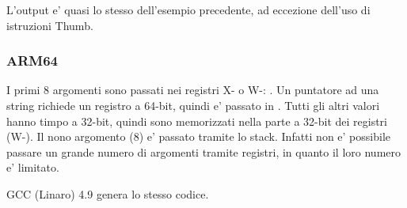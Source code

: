 L'output e' quasi lo stesso dell'esempio precedente, ad eccezione dell'uso di istruzioni Thumb. 

\subsubsection{ARM64}




I primi 8 argomenti sono passati nei registri X- o W-: \ARMPCS.
Un puntatore ad una string richiede un registro a 64-bit, quindi e' passato in .
Tutti gli altri valori hanno timpo \Tint a 32-bit, quindi sono memorizzati nella parte a 32-bit dei registri (W-).
Il nono argomento (8) e' passato tramite lo stack.
Infatti non e' possibile passare un grande numero di argomenti tramite registri, in quanto il loro numero e' limitato.

\Optimizing GCC (Linaro) 4.9 genera lo stesso codice.
